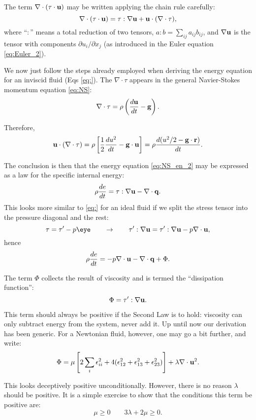 The term $\nabla\cdot ( \tau \cdot \mathbf{u} )$ may be written applying the
chain rule carefully:
\begin{equation}
  \nabla\cdot ( \tau \cdot  \mathbf{u} ) =
  \tau : \nabla\mathbf{u} + \mathbf{u}\cdot(\nabla\cdot\tau) ,
\label{eq:nabla_tau_u}
\end{equation}
where ``$:$'' means a total reduction of two tensors, $a:b=\sum_{ij}
a_{ij} b_{ij} $, and $\nabla\mathbf{u}$ is the tensor with components
$\partial u_i/\partial x_j$ (as introduced in the Euler
equation \ref{eq:Euler_2}).

We now just follow the steps already employed when deriving the energy
equation for an inviscid fluid (Eqs \ref{eq:}).  The $\nabla\cdot\tau$
appears in the general Navier-Stokes momentum equation \ref{eq:NS}:
\[
 \nabla \cdot \tau =
\rho \left( \frac{d\mathbf{u} }{dt}    - \mathbf{g} \right) .
\]

Therefore,
\[
\mathbf{u}\cdot(\nabla\cdot\tau) =
 \rho \left[
 \frac12 
  \frac{d u^2 }{dt}    - \mathbf{g}\cdot\mathbf{u}
  \right] =
   \rho
  \frac{d (u^2 /2 - \mathbf{g}\cdot\mathbf{r} ) }{dt}    .
\]

The conclusion is then that the energy equation \ref{eq:NS_en_2} may be
expressed as a law for the specific internal energy:
\[
\rho \frac{d e }{dt}  = 
  \tau : \nabla\mathbf{u} - \nabla\cdot\mathbf{q} .
\]
This looks more similar to \ref{eq:} for an ideal fluid if we split the
stress tensor into the pressure diagonal and the rest:
\[
\tau = \tau' - p \eye \qquad \to \qquad
 \tau' : \nabla\bfu = \tau' : \nabla\bfu - p \divu ,
\]
hence
\[
\rho \frac{d e }{dt}  =  - p \nabla\cdot\mathbf{u} - \nabla\cdot\mathbf{q}  + \Phi .
\]

The term $\Phi$ collects the result of viscosity and is termed
the ``dissipation function'':
\[
\Phi = \tau' : \nabla\mathbf{u} .
\]

This term should always be positive if the Second Law is to hold:
viscosity can only subtract energy from the system, never add it.
Up until now our derivation has been generic. For a Newtonian fluid,
however, one may go a bit further, and write:
\begin{equation}
  \Phi = \mu
  \left[
    2 \sum_i \epsilon_{ii}^2 +
    4  (\epsilon_{12}^2 + \epsilon_{13}^2 + \epsilon_{23}^2 )
  \right]+
  \lambda \nabla\cdot\mathbf{u}^2 .\label{eq:Phi_Newtonian}
\end{equation}

This looks deceptively positive unconditionally. However, there is no
reason $\lambda$ should be positive. It is a simple exercise to show
that the conditions this term be positive are:
\begin{equation}
  \mu \ge 0 \qquad 3\lambda + 2\mu \ge 0 .\label{eq:mu_lambda_cond}
\end{equation}


